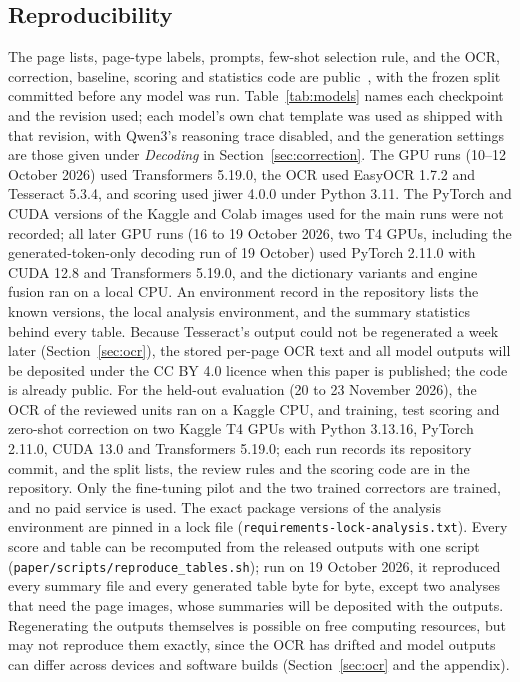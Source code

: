 \documentclass[conference]{IEEEtran}
\begin{document}
\subsection{Reproducibility}
\label{sec:repro}
The page lists, page-type labels, prompts, few-shot selection rule, and the OCR, correction, baseline, scoring and statistics code are public~\cite{rahman2026repo}, with the frozen split committed before any model was run. Table~\ref{tab:models} names each checkpoint and the revision used; each model's own chat template was used as shipped with that revision, with Qwen3's reasoning trace disabled, and the generation settings are those given under \emph{Decoding} in Section~\ref{sec:correction}. The GPU runs (10--12 October 2026) used Transformers 5.19.0, the OCR used EasyOCR 1.7.2 and Tesseract 5.3.4, and scoring used jiwer 4.0.0 under Python 3.11. The PyTorch and CUDA versions of the Kaggle and Colab images used for the main runs were not recorded; all later GPU runs (16 to 19 October 2026, two T4 GPUs, including the generated-token-only decoding run of 19 October) used PyTorch 2.11.0 with CUDA 12.8 and Transformers 5.19.0, and the dictionary variants and engine fusion ran on a local CPU. An environment record in the repository lists the known versions, the local analysis environment, and the summary statistics behind every table. Because Tesseract's output could not be regenerated a week later (Section~\ref{sec:ocr}), the stored per-page OCR text and all model outputs will be deposited under the CC BY 4.0 licence when this paper is published; the code is already public. For the held-out evaluation (20 to 23 November 2026), the OCR of the reviewed units ran on a Kaggle CPU, and training, test scoring and zero-shot correction on two Kaggle T4 GPUs with Python 3.13.16, PyTorch 2.11.0, CUDA 13.0 and Transformers 5.19.0; each run records its repository commit, and the split lists, the review rules and the scoring code are in the repository. Only the fine-tuning pilot and the two trained correctors are trained, and no paid service is used. The exact package versions of the analysis environment are pinned in a lock file (\texttt{requirements-lock-analysis.txt}). Every score and table can be recomputed from the released outputs with one script (\texttt{paper/scripts/reproduce\_tables.sh}); run on 19 October 2026, it reproduced every summary file and every generated table byte for byte, except two analyses that need the page images, whose summaries will be deposited with the outputs. Regenerating the outputs themselves is possible on free computing resources, but may not reproduce them exactly, since the OCR has drifted and model outputs can differ across devices and software builds (Section~\ref{sec:ocr} and the appendix).
\end{document}
